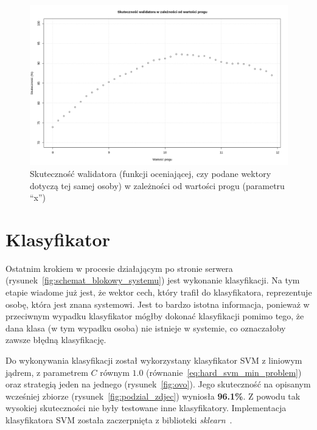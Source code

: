 \begin{figure}[]
    \centering
    \includegraphics[width=1\textwidth]{images/trafnosc_walidator_a_prog}
    \caption{
        Skuteczność walidatora (funkcji oceniającej, czy podane wektory dotyczą tej
        samej osoby) w zależności od wartości progu (parametru ``x'')
    }
    \customsource
    \label{fig:tranosc_walidatora_per_prog}
\end{figure}

\pagebreak


\section{Klasyfikator}

Ostatnim krokiem w procesie działającym po stronie serwera (rysunek~\ref{fig:schemat_blokowy_systemu})
jest wykonanie klasyfikacji.
Na tym etapie wiadome już jest, że wektor cech, który trafił do klasyfikatora, reprezentuje osobę,
która jest znana systemowi.
Jest to bardzo istotna informacja, ponieważ w przeciwnym wypadku klasyfikator
mógłby dokonać klasyfikacji pomimo tego, że dana klasa (w tym wypadku osoba) nie istnieje w systemie,
co oznaczałoby zawsze błędną klasyfikację.

Do wykonywania klasyfikacji został wykorzystany klasyfikator SVM z liniowym jądrem,
z parametrem $C$ równym $1.0$ (równanie~\ref{eq:hard_svm_min_problem}) oraz
strategią jeden na jednego (rysunek~\ref{fig:ovo}).
Jego skuteczność na opisanym wcześniej zbiorze (rysunek~\ref{fig:podzial_zdjec}) wyniosła \textbf{96.1\%}.
Z powodu tak wysokiej skuteczności nie były testowane inne klasyfikatory.
Implementacja klasyfikatora SVM została zaczerpnięta z biblioteki \textit{sklearn}~\cite{sklearn_api}.



